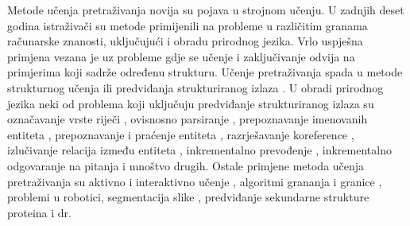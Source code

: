 Metode učenja pretraživanja  novija su
pojava u strojnom učenju. U zadnjih deset godina istraživači su metode
primijenili na probleme u različitim granama računarske znanosti, uključujući i
obradu prirodnog jezika. Vrlo uspješna primjena vezana je uz probleme gdje se
učenje i zaključivanje odvija na primjerima koji sadrže određenu strukturu.
Učenje pretraživanja spada u metode strukturnog učenja  ili predviđanja strukturiranog izlaza . U obradi prirodnog jezika neki od problema koji uključuju
predviđanje strukturiranog izlaza su označavanje vrste riječi
, ovisnosno parsiranje ,
prepoznavanje imenovanih entiteta , prepoznavanje
i praćenje entiteta , razrješavanje
koreference , izlučivanje relacija između entiteta
, inkrementalno prevođenje , inkrementalno odgovaranje na pitanja  i mnoštvo drugih. Ostale primjene metoda učenja pretraživanja su
aktivno i interaktivno učenje , algoritmi
grananja i granice , problemi u robotici, segmentacija
slike , predviđanje sekundarne strukture proteina
 i dr.

